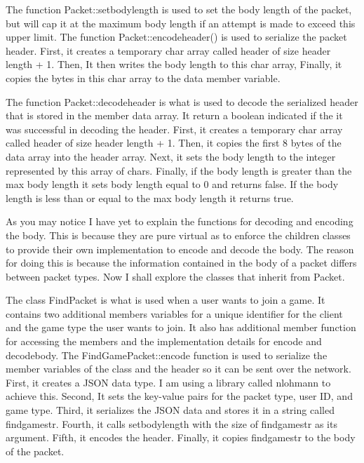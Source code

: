 \documentclass[conference]{IEEEtran}
\begin{document}
The function Packet::set\textunderscore body\textunderscore length is used to set the body length of the packet, but will cap it at the maximum body length if an attempt is made to exceed this upper limit.
The function Packet::encode\textunderscore header() is used to serialize the packet header.
First, it creates a temporary char array called header of size header length + 1.
Then, It then writes the body length to this char array,
Finally, it copies the bytes in this char array to the data member variable.

The function Packet::decode\textunderscore header is what is used to decode the serialized header that is stored in the member data array.
It return a boolean indicated if the it was successful in decoding the header.
First, it creates a temporary char array called header of size header length + 1.
Then, it copies the first 8 bytes of the data array into the header array.
Next, it sets the body length to the integer represented by this array of chars.
Finally, if the body length is greater than the max body length it sets body length equal to 0 and returns false.
If the body length is less than or equal to the max body length it returns true.

As you may notice I have yet to explain the functions for decoding and encoding the body.
This is because they are pure virtual as to enforce the children classes to provide their own implementation to encode and decode the body. 
The reason for doing this is because the information contained in the body of a packet differs between packet types.
Now I shall explore the classes that inherit from Packet.

The class FindPacket is what is used when a user wants to join a game.
It contains two additional members variables for a unique identifier for the client and the game type the user wants to join.
It also has additional member function for accessing the members and the implementation details for encode and decode\textunderscore body.
The FindGamePacket::encode function is used to serialize the member variables of the class and the header so it can be sent over the network.
First, it creates a JSON data type.
I am using a library called nlohmann to achieve this.
Second, It sets the key-value pairs for the packet type, user ID, and game type.
Third, it serializes the JSON data and stores it in a string called find\textunderscore game\textunderscore str.
Fourth, it calls set\textunderscore body\textunderscore length with the size of find\textunderscore game\textunderscore str as its argument.
Fifth, it encodes the header.
Finally, it copies find\textunderscore game\textunderscore str to the body of the packet.
\end{document}
